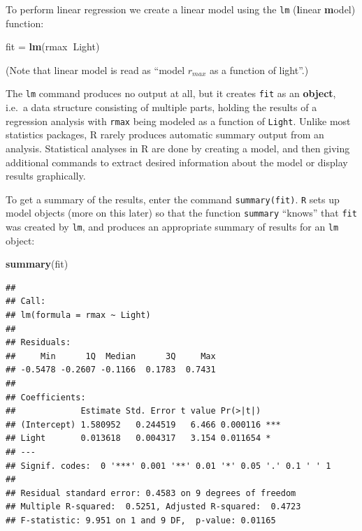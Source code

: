 \documentclass[11pt,]{article}
\newenvironment{Shaded}{\begin{snugshade}}{\end{snugshade}}
\newcommand{\KeywordTok}[1]{\textcolor[rgb]{0.13,0.29,0.53}{\textbf{#1}}}
\newcommand{\NormalTok}[1]{#1}
\newcommand{\OperatorTok}[1]{\textcolor[rgb]{0.81,0.36,0.00}{\textbf{#1}}}
\newcommand{\StringTok}[1]{\textcolor[rgb]{0.31,0.60,0.02}{#1}}
\begin{document}
To perform linear regression we create a linear model using the \texttt{lm} (\textbf{l}inear \textbf{m}odel) function:

\begin{Shaded}
\begin{Highlighting}[]
\NormalTok{fit =}\StringTok{ }\KeywordTok{lm}\NormalTok{(rmax}\OperatorTok{~}\NormalTok{Light)}
\end{Highlighting}
\end{Shaded}

(Note that linear model is read as ``model \(r_{max}\) as a function of light''.)

The \texttt{lm} command produces no output at all, but it creates \texttt{fit} as an \textbf{object}, i.e.~a data structure consisting of multiple parts, holding the results of a regression analysis with \texttt{rmax} being modeled as a
function of \texttt{Light}. Unlike most statistics packages, R rarely produces automatic summary output from an analysis. Statistical analyses in R are done by creating a model, and then giving additional commands to extract desired information about the model or display results graphically.

To get a summary of the results, enter the command \texttt{summary(fit)}. \texttt{R} sets up model objects (more on this later) so that the function \texttt{summary} ``knows'' that \texttt{fit} was created by \texttt{lm}, and produces an appropriate summary of results for an \texttt{lm} object:

\begin{Shaded}
\begin{Highlighting}[]
\KeywordTok{summary}\NormalTok{(fit)}
\end{Highlighting}
\end{Shaded}

\begin{verbatim}
## 
## Call:
## lm(formula = rmax ~ Light)
## 
## Residuals:
##     Min      1Q  Median      3Q     Max 
## -0.5478 -0.2607 -0.1166  0.1783  0.7431 
## 
## Coefficients:
##             Estimate Std. Error t value Pr(>|t|)    
## (Intercept) 1.580952   0.244519   6.466 0.000116 ***
## Light       0.013618   0.004317   3.154 0.011654 *  
## ---
## Signif. codes:  0 '***' 0.001 '**' 0.01 '*' 0.05 '.' 0.1 ' ' 1
## 
## Residual standard error: 0.4583 on 9 degrees of freedom
## Multiple R-squared:  0.5251, Adjusted R-squared:  0.4723 
## F-statistic: 9.951 on 1 and 9 DF,  p-value: 0.01165
\end{verbatim}
\end{document}
